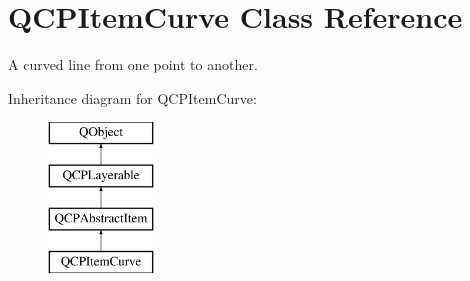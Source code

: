 \hypertarget{class_q_c_p_item_curve}{}\section{Q\+C\+P\+Item\+Curve Class Reference}
\label{class_q_c_p_item_curve}


A curved line from one point to another.  


Inheritance diagram for Q\+C\+P\+Item\+Curve\+:\begin{figure}[H]
\begin{center}
\leavevmode
\includegraphics[height=4.000000cm]{class_q_c_p_item_curve}
\end{center}
\end{figure}
